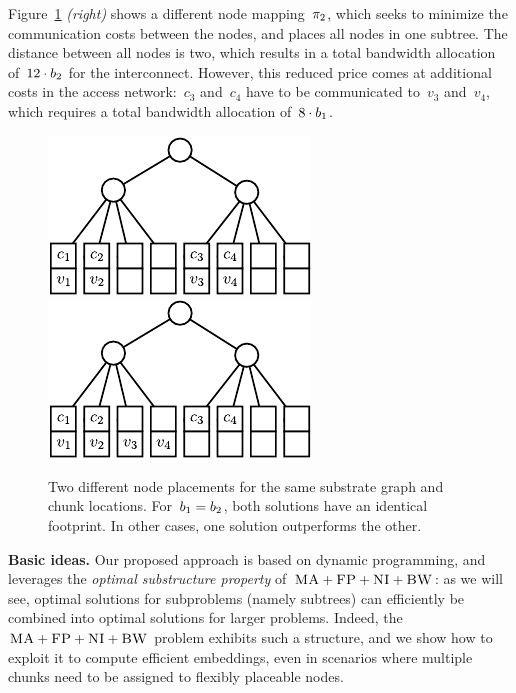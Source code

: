 Figure~\ref{fig:dynamic_motivation} \emph{(right)} shows a different node
mapping~$\pi_2$, which seeks to minimize the communication costs
between the nodes, and places all nodes in one subtree. The distance between all
nodes is two, which results in a total bandwidth allocation of~$12\cdot b_2$
for the interconnect. However, this reduced price comes at additional costs in
the access network:~$c_3$ and~$c_4$ have to be communicated to~$v_3$ and~$v_4$,
which requires a total bandwidth allocation of~$8 \cdot b_1$.


\begin{figure}
\includegraphics[width = 0.49\columnwidth]{figs/static-mapping/dynamic_bad}
\hfill
\includegraphics[width = 0.49\columnwidth]{figs/static-mapping/dynamic_good}
\caption{Two different node placements for the same substrate graph and chunk
locations. For~$b_1 = b_2$, both solutions have an identical
footprint. In other cases, one solution outperforms the other.}
\label{fig:dynamic_motivation}
\vspace{-1em}
\end{figure}



\textbf{Basic ideas.} Our proposed approach is based on dynamic programming, and
leverages the \emph{optimal substructure property} of~$\textsc{MA}+\textsc{FP}+\textsc{NI}+\textsc{BW}$:
as we will see, optimal solutions for subproblems (namely subtrees)
can efficiently be combined into optimal solutions for larger problems.
Indeed, the~$\textsc{MA}+\textsc{FP}+\textsc{NI}+\textsc{BW}$ problem
exhibits such a structure, and we show how to exploit it to
compute efficient embeddings, even in scenarios where multiple chunks
need to be assigned to flexibly placeable nodes.

